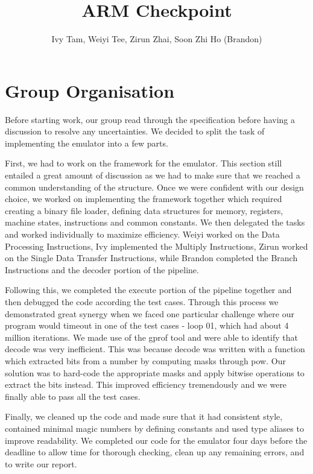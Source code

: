\documentclass[11pt]{article}
\begin{document}
\title{ARM Checkpoint}
\author{Ivy Tam, Weiyi Tee, Zirun Zhai, Soon Zhi Ho (Brandon)}

\maketitle

\section{Group Organisation}

Before starting work, our group read through the specification before having a discussion to resolve any uncertainties. We decided to split the task of implementing the emulator into a few parts. \par 
First, we had to work on the framework for the emulator. This section still entailed a great amount of discussion as we had to make sure that we reached a common understanding of the structure. Once we were confident with our design choice, we worked on implementing the framework together which required creating a binary file loader, defining data structures for memory, registers, machine states, instructions and common constants. We then delegated the tasks and worked individually to maximize efficiency. Weiyi worked on the Data Processing Instructions, Ivy implemented the Multiply Instructions, Zirun worked on the Single Data Transfer Instructions, while Brandon completed the Branch Instructions and the decoder portion of the pipeline. \par 
Following this, we completed the execute portion of the pipeline together and then debugged the code according the test cases. Through this process we demonstrated great synergy when we faced one particular challenge where our program would timeout in one of the test cases - loop 01, which had about 4 million iterations. We made use of the gprof tool and were able to identify that decode was very inefficient. This was because decode was written with a function which extracted bits from a number by computing masks through pow. Our solution was to hard-code the appropriate masks and apply bitwise operations to extract the bits instead. This improved efficiency tremendously and we were finally able to pass all the test cases. \par 
Finally, we cleaned up the code and made sure that it had consistent style, contained minimal magic numbers by defining constants and used type aliases to improve readability. We completed our code for the emulator four days before the deadline to allow time for thorough checking, clean up any remaining errors, and to write our report. \par 
\end{document}
